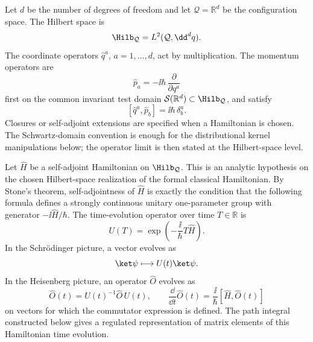 \begin{definition}
\label{def:schrodinger-representation-datum}
Let \(d\) be the number of degrees of freedom and let
\(\mathcal Q=\mathbb R^d\) be the configuration space. The Hilbert space is
\[
  \Hilb_{\mathcal Q}=L^2(\mathcal Q,\dd^dq).
\]
The coordinate operators \(\widehat q^a\), \(a=1,\ldots,d\), act by
multiplication. The momentum operators are
\[
  \widehat p_a=-\ii\hbar\,\frac{\partial}{\partial q^a}
\]
first on the common invariant test domain
\(\mathcal S(\mathbb R^d)\subset\Hilb_{\mathcal Q}\), and satisfy
\[
  [\widehat q^a,\widehat p_b]=\ii\hbar\,\delta^a_b.
\]
Closures or self-adjoint extensions are specified when a Hamiltonian is
chosen.  The Schwartz-domain convention is enough for the distributional kernel
manipulations below; the operator limit is then stated at the Hilbert-space
level.

Let \(\widehat H\) be a self-adjoint Hamiltonian on \(\Hilb_{\mathcal Q}\).
This is an analytic hypothesis on the chosen Hilbert-space realization of the
formal classical Hamiltonian.  By Stone's theorem, self-adjointness of
\(\widehat H\) is exactly the condition that the following formula defines a
strongly continuous unitary one-parameter group with generator
\(-\ii\widehat H/\hbar\).  The time-evolution operator over
time \(T\in\mathbb R\) is
\[
  U(T)=\exp\left(-\frac{\ii}{\hbar}T\widehat H\right).
\]
In the Schr\"odinger picture, a vector evolves as
\[
  \ket\psi\longmapsto U(t)\ket\psi .
\]
In the Heisenberg picture, an operator \(\widehat O\) evolves as
\[
  \widehat O(t)=U(t)^{-1}\widehat O\,U(t),
  \qquad
  \frac{\dd}{\dd t}\widehat O(t)
  =
  \frac{\ii}{\hbar}[\widehat H,\widehat O(t)]
\]
on vectors for which the commutator expression is defined.  The path integral
constructed below gives a regulated representation of matrix elements of this
Hamiltonian time evolution.
\end{definition}

